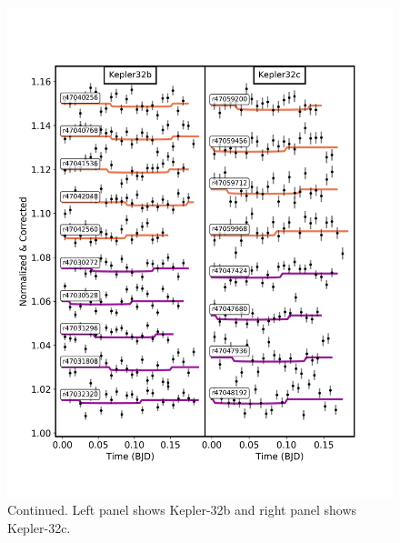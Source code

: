 \begin{subappendices}
\addtocounter{figure}{-1}
\begin{figure}
  \includegraphics[trim={0 1cm 0 0},clip,width=\textwidth]{CorrectedLighctuvesPLDKepler32_circ_fixaincrp.pdf}
  \caption{Continued. Left panel shows Kepler-32b and right panel shows Kepler-32c.}
  \label{P4:fig:normlcK32}
\end{figure}



\end{subappendices}
